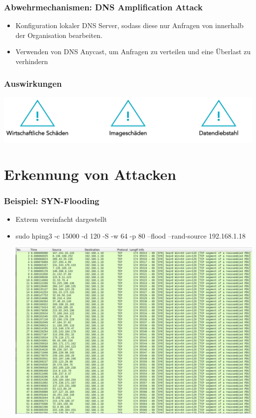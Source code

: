 \documentclass{beamer}
\begin{document}
\begin{frame}
	\frametitle{Abwehrmechanismen: DNS Amplification Attack}
	\begin{itemize}
		\item Konfiguration lokaler DNS Server, sodass diese nur Anfragen von innerhalb der Organisation bearbeiten.
		\item Verwenden von DNS Anycast, um Anfragen zu verteilen und eine Überlast zu verhindern
	\end{itemize}
\end{frame}

\begin{frame}
	\frametitle{Auswirkungen}
	\begin{center}
		\includegraphics[width=1.0\linewidth]{img/12}
	\end{center}
\end{frame}

\section{Erkennung von Attacken}
\begin{frame}
	\frametitle{Beispiel: SYN-Flooding}
	\begin{itemize}
		\item Extrem vereinfacht dargestellt
		\item[] sudo hping3 -c 15000 -d 120 -S -w 64 -p 80 --flood --rand-source 192.168.1.18
		      \begin{center}
			      \includegraphics[width=0.7\linewidth]{img/14}
		      \end{center}
	\end{itemize}
\end{frame}
\end{document}
